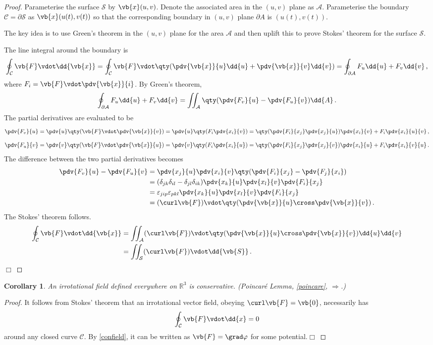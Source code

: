 \documentclass{article}
\theoremstyle{plain}\theoremheaderfont{\normalfont\itshape}\theorembodyfont{\rmfamily}\theoremseparator{.}\newtheorem*{rem}{Remark}\newtheorem*{ex}{Example}\newtheorem*{proof}{Proof}\newtheorem*{altp}{Alternative proof}
\theoremstyle{plain}\theoremheaderfont{\normalfont\bfseries}\theorembodyfont{\rmfamily}\theoremseparator{.}\newtheorem{thm}{Theorem}[section]\newtheorem{lem}[thm]{Lemma}\newtheorem{prop}[thm]{Proposition}\newtheorem*{cor}{Corollary}\newtheorem{defn}[thm]{Definition}\newtheorem{clm}[thm]{Claim}\newtheorem{clminproof}{Claim}
\theoremstyle{break}\theoremheaderfont{\normalfont\itshape}\theorembodyfont{\rmfamily}\theoremseparator{.\medskip}\newtheorem*{proofskip}{Proof}\newtheorem*{exs}{Examples}\newtheorem*{rems}{Remarks}
\theoremstyle{break}\theoremheaderfont{\normalfont\bfseries}\theorembodyfont{\rmfamily}\theoremseparator{.\medskip}\newtheorem{lemskip}[thm]{Lemma}\newtheorem{defnskip}[thm]{Definition}\newtheorem{propskip}[thm]{Proposition}\newtheorem{thmskip}[thm]{Theorem}
\numberwithin{equation}{section}
\newcommand{\qed}{\hfill\ensuremath{\Box}}
\begin{document}
	\begin{proof}
		Parameterise the surface \(\mathcal{S}\) by \(\vb{x}(u,v)\). Denote the associated area in the \((u,v)\) plane as \(\mathcal{A}\). Parameterise the boundary \(\mathcal{C}=\partial\mathcal{S}\) as \(\vb{x}(u(t),v(t))\) so that the corresponding boundary in \((u,v)\) plane \(\partial A\) is \((u(t),v(t))\).

		The key idea is to use Green's theorem in the \((u, v)\) plane for the area \(\mathcal{A}\) and then uplift this to prove Stokes' theorem for the surface \(\mathcal{S}\).

		The line integral around the boundary is
		\[\oint_\mathcal{C}\vb{F}\vdot\dd{\vb{x}}=\oint_\mathcal{C}\vb{F}\vdot\qty(\pdv{\vb{x}}{u}\dd{u}+\pdv{\vb{x}}{v}\dd{v})=\oint_{\partial\mathcal{A}}F_u\dd{u}+F_v\dd{v}\,,\]
		where \(F_i=\vb{F}\vdot\pdv{\vb{x}}{i}\). By Green's theorem,
		\[\oint_{\partial\mathcal{A}}F_u\dd{u}+F_v\dd{v}=\iint_\mathcal{A}\qty(\pdv{F_v}{u}-\pdv{F_u}{v})\dd{A}\,.\]
		The partial derivatives are evaluated to be
		\[\pdv{F_v}{u}=\pdv{u}\qty(\vb{F}\vdot\pdv{\vb{x}}{v})=\pdv{u}\qty(F_i\pdv{x_i}{v})=\qty(\pdv{F_i}{x_j}\pdv{x_j}{u})\pdv{x_i}{v}+F_i\pdv{x_i}{u}{v}\,,\]
		\[\pdv{F_u}{v}=\pdv{v}\qty(\vb{F}\vdot\pdv{\vb{x}}{u})=\pdv{v}\qty(F_i\pdv{x_i}{u})=\qty(\pdv{F_i}{x_j}\pdv{x_j}{v})\pdv{x_i}{u}+F_i\pdv{x_i}{v}{u}\,.\]
		The difference between the two partial derivatives becomes
		\begin{align*}
			\pdv{F_v}{u}-\pdv{F_u}{v}&=\pdv{x_j}{u}\pdv{x_i}{v}\qty(\pdv{F_i}{x_j}-\pdv{F_j}{x_i})\\
			&=(\delta_{jk}\delta_{il}-\delta_{jl}\delta_{ik})\pdv{x_k}{u}\pdv{x_l}{v}\pdv{F_i}{x_j}\\
			&=\varepsilon_{jip}\varepsilon_{pkl}\pdv{x_k}{u}\pdv{x_l}{v}\pdv{F_i}{x_j}\\
			&=(\curl\vb{F})\vdot\qty(\pdv{\vb{x}}{u}\cross\pdv{\vb{x}}{v})\,.
		\end{align*}
		The Stokes' theorem follows.
		\begin{align*}
			\oint_\mathcal{C}\vb{F}\vdot\dd{\vb{x}}&=\iint_\mathcal{A}(\curl\vb{F})\vdot\qty(\pdv{\vb{x}}{u}\cross\pdv{\vb{x}}{v})\dd{u}\dd{v}\\
			&=\iint_\mathcal{S}(\curl\vb{F})\vdot\dd{\vb{S}}\,.
		\end{align*}\qed
	\end{proof}
	\begin{cor}
		An irrotational field defined everywhere on \(\mathbb{R}^3\) is conservative. (Poincar\'{e} Lemma, \cref{poincare}, \(\Rightarrow\).)
	\end{cor}
	\begin{proof}
		It follows from Stokes' theorem that an irrotational vector field, obeying
		\(\curl\vb{F}=\vb{0}\), necessarily has
		\[\oint_\mathcal{C}\vb{F}\vdot\dd{x}=0\]
		around any closed curve \(\mathcal{C}\). By \cref{confield}, it can be written as \(\vb{F}=\grad\varphi\) for some potential.\qed
	\end{proof}
\end{document}
